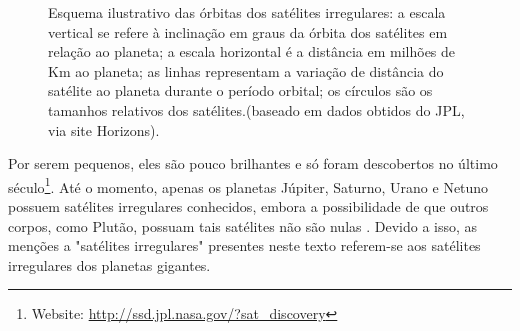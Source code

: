\documentclass[12pt,a4paper]{report}
\begin{document}
\begin{figure}[h]
\begin{centering}
\caption{Esquema ilustrativo das órbitas dos satélites irregulares: a escala vertical se refere à inclinação em graus da órbita dos satélites em relação ao planeta; a escala horizontal é a distância em milhões de Km ao planeta; as linhas representam a variação de distância do satélite ao planeta durante o período orbital; os círculos são os tamanhos relativos dos satélites.(baseado em dados obtidos do JPL, via site Horizons).
\label{Fig:sat-conf}}
\end{centering}
\end{figure}

Por serem pequenos, eles são pouco brilhantes e só foram descobertos no último século\footnote{Website: \url{http://ssd.jpl.nasa.gov/?sat\_discovery}}. Até o momento, apenas os planetas Júpiter, Saturno, Urano e Netuno possuem satélites irregulares conhecidos, embora a possibilidade de que outros corpos, como Plutão, possuam tais satélites não são nulas \citep{Michaely2017}. Devido a isso, as menções a "satélites irregulares" presentes neste texto referem-se aos satélites irregulares dos planetas gigantes.



\end{document}
